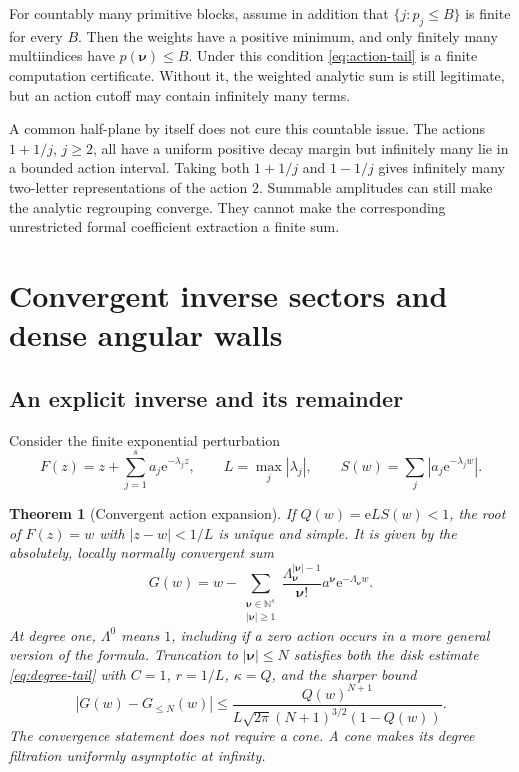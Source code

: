 \documentclass[11pt,a4paper]{article}
\numberwithin{equation}{section}
\newtheorem{theorem}{Theorem}[section]
\theoremstyle{definition}
\theoremstyle{remark}
\newcommand{\N}{\mathbb N}
\newcommand{\e}{\mathrm e}
\newcommand{\nn}{\boldsymbol\nu}
\begin{document}
For countably many primitive blocks, assume in addition that
$\{j:p_j\le B\}$ is finite for every $B$. Then the weights have a positive
minimum, and only finitely many multiindices have $p(\nn)\le B$.
Under this condition \eqref{eq:action-tail} is a finite computation
certificate. Without it, the weighted analytic sum is still legitimate,
but an action cutoff may contain infinitely many terms.

A common half-plane by itself does not cure this countable issue. The
actions $1+1/j$, $j\ge2$, all have a uniform positive decay margin but
infinitely many lie in a bounded action interval. Taking both
$1+1/j$ and $1-1/j$ gives infinitely many two-letter representations of
the action $2$. Summable amplitudes can still make the analytic regrouping
converge. They cannot make the corresponding unrestricted formal
coefficient extraction a finite sum.

\section{Convergent inverse sectors and dense angular walls}\label{sec:atlas}

\subsection{An explicit inverse and its remainder}

Consider the finite exponential perturbation
\begin{equation}\label{eq:finite-F}
 F(z)=z+\sum_{j=1}^s a_j\e^{-\lambda_j z},
 \qquad L=\max_j|\lambda_j|,
 \qquad S(w)=\sum_j|a_j\e^{-\lambda_jw}|.
\end{equation}

\begin{theorem}[Convergent action expansion]\label{thm:exp-inverse}
If $Q(w)=\e L S(w)<1$, the root of $F(z)=w$ with $|z-w|<1/L$ is
unique and simple. It is given by the absolutely, locally normally
convergent sum
\begin{equation}\label{eq:explicit-inverse}
 G(w)=w-
 \sum_{\substack{\nn\in\N^s\\|\nn|\ge1}}
 \frac{\Lambda_{\nn}^{|\nn|-1}}{\nn!}
 a^{\nn}\e^{-\Lambda_{\nn}w}.
\end{equation}
At degree one, $\Lambda^0$ means $1$, including if a zero action occurs
in a more general version of the formula. Truncation to $|\nn|\le N$
satisfies both the disk estimate \eqref{eq:degree-tail} with $C=1$,
$r=1/L$, $\kappa=Q$, and the sharper bound
\begin{equation}\label{eq:cayley-tail}
 |G(w)-G_{\le N}(w)|\le
 \frac{Q(w)^{N+1}}{L\sqrt{2\pi}(N+1)^{3/2}(1-Q(w))}.
\end{equation}
The convergence statement does not require a cone. A cone makes its
degree filtration uniformly asymptotic at infinity.
\end{theorem}
\end{document}
